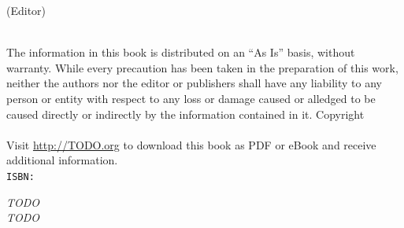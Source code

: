 \thispagestyle{empty}
\booktitle
\newpage
\newpage
\begin{titlepage}
\begin{flushright}
\bookeditor{} (Editor)\\
\vspace{10em}
{\Huge\bfseries\sffamily\booktitle}\\
\vspace{2em}
{\large\sffamily\booksubtitle}
\end{flushright}
\end{titlepage}
\thispagestyle{empty}
The information in this book is distributed on an ``As Is'' basis, without warranty. While every precaution has been taken in the preparation of this work, neither the authors nor the editor or publishers shall have any liability to any person or entity with respect to any loss or damage caused or alledged to be caused directly or indirectly by the information contained in it.%
\vfill
Copyright \textcopyright{} \bookyear{} \bookauthors\\
\newline
{}
\newline \\
Visit \url{http://TODO.org} to download this book as PDF or eBook and receive additional information.
\newline \\
{\tt ISBN: \bookisbn}%
\newpage
\thispagestyle{empty}
\vspace*{2cm}
\begin{flushright}
{\Large\itshape TODO\\TODO{}}\\
\end{flushright}
\newpage
\thispagestyle{empty}
\mbox{}
\newpage
